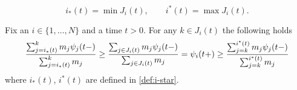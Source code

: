 \documentclass[10pt,a4paper]{amsart}
\begin{document}
\begin{equation}\label{def:i-star}
    i_*(t)=\min J_i(t),\qquad i^*(t)=\max J_i(t).
\end{equation}

\begin{lemma}\label{lemma: barycentric}
    Fix an $i\in\{1,\dots,N\}$ and a time $t>0$. For any $k\in J_i(t)$ the following holds
    \begin{equation}\label{barycentric equation}
        \frac{\sum_{j=i_*(t)}^km_j\psi_j(t-)}{\sum_{j=i_*(t)}^km_j}\geq
                \frac{\sum_{j\in J_i(t)}m_j\psi_j(t-)} {\sum_
          {{\color{black}j\in J_i(t)}} m_j}=\psi_i(t+)\geq\frac{\sum_{j=k}^{i^*(t)}m_j\psi_j(t-)}{\sum_{j=k}^{i^*(t)}m_j}
    \end{equation}
    {\color{black} where $i_*(t)$, $i^*(t)$ are defined in \eqref{def:i-star}.}
\end{lemma}
\end{document}
